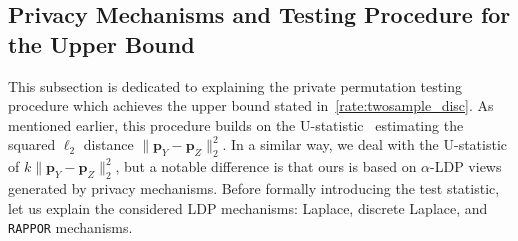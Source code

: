 \documentclass[twoside,11pt]{article}
\newcommand{\rvTwo}{Y}
\newcommand{\rvThree}{Z}
\newcommand{\alphabetSize}{k} %
\newcommand{\probVec}{\mathbf{p}} %
\newcommand{\privacyParameter}{\alpha} %
\begin{document}
\subsection{Privacy Mechanisms and Testing Procedure for the Upper Bound}\label{subsection:twosample_disc_upperbound}
This subsection is dedicated to explaining the private permutation testing procedure which achieves the upper bound stated in~\eqref{rate:twosample_disc}. As mentioned earlier, this procedure builds on the U-statistic~\citep{kim_minimax_2022} estimating the squared $\ell_2$ distance $\| \probVec_\rvTwo - \probVec_\rvThree \|_2^2$.
In a similar way, we deal with the U-statistic of $\alphabetSize \| \probVec_\rvTwo - \probVec_\rvThree \|_2^2$, but a notable difference is that ours is based on $\privacyParameter$-LDP views generated by privacy mechanisms. Before formally introducing the test statistic, let us explain the considered LDP mechanisms: Laplace, discrete Laplace, and \texttt{RAPPOR} mechanisms.
\end{document}
